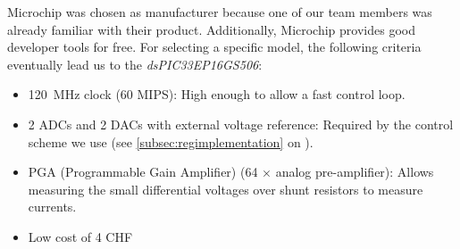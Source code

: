 Microchip  was chosen  as manufacturer  because one  of our  team members  was
already familiar  with their  product.  Additionally, Microchip  provides good
developer  tools  for free. For  selecting  a  specific model,  the  following
criteria eventually lead us to the \emph{dsPIC33EP16GS506}:

\begin{itemize}
    \item
        \SI{120}{\mega\hertz}  clock (60  MIPS): High enough  to allow  a fast
        control loop.
    \item
        2  ADCs  and  2  DACs with  external  voltage  reference: Required  by
        the  control  scheme  we use  (see  \ref{subsec:regimplementation}  on
        \pageref{subsec:regimplementation}).
    \item
        PGA    (Programmable    Gain    Amplifier)   (64    $\times$    analog
        pre-amplifier): Allows measuring the small differential voltages over
        shunt resistors to measure currents.
    \item
        Low cost of 4 CHF
\end{itemize}
